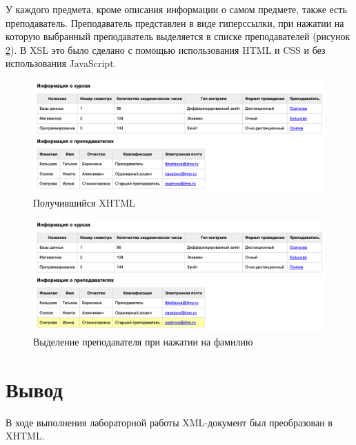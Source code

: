 \documentclass[a4paper, 14pt]{extarticle}
\begin{document}
У каждого предмета, кроме описания информации о самом предмете, также есть
преподаватель. Преподаватель представлен в виде гиперссылки, при нажатии на
которую выбранный преподаватель выделяется в списке преподавателей (рисунок
\ref{fig:example-selected.png}). В XSL это было сделано с помощью использования
HTML и CSS и без использования \foreignlanguage{english}{JavaScript}.

\begin{figure}[H]
  \centering
  \includegraphics[width=\textwidth]{images/example.png}
  \caption{Получившийся XHTML}
  \label{fig:example.png}
\end{figure}

\begin{figure}[H]
  \centering
  \includegraphics[width=\textwidth]{images/example-selected.png}
  \caption{Выделение преподавателя при нажатии на фамилию}
  \label{fig:example-selected.png}
\end{figure}

\section{Вывод}

В ходе выполнения лабораторной работы XML-документ был преобразован в XHTML.
\end{document}
